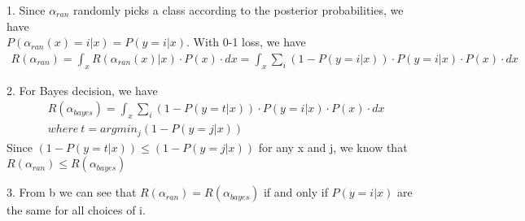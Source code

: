 \documentclass[12pt]{article}
\newenvironment{problem}[2][Problem]{\begin{trivlist}
\item[\hskip \labelsep {\bfseries #1}\hskip \labelsep {\bfseries #2}]}{\end{trivlist}}
\begin{document}
\begin{problem}{2. Bayesian vs randomized decision}
\item{1.} Since $\alpha_{ran}$ randomly picks a class according to the posterior probabilities, we have\\ 
  $P(\alpha_{ran}(x) = i|x) = P(y=i|x)$. With 0-1 loss, we have
  \begin{align*}
	R(\alpha_{ran}) = \int_xR(\alpha_{ran}(x)|x) \cdot P(x) \cdot dx = 
	\int_x \sum_i (1-P(y=i|x)) \cdot P(y=i|x) \cdot P(x) \cdot dx
  \end{align*}
\item{2.} For Bayes decision, we have
  \begin{align*}
	& R(\alpha_{bayes}) = \int_x \sum_i (1-P(y=t|x)) \cdot P(y=i|x) \cdot P(x) \cdot dx \\
	& where\ t = argmin_j(1-P(y=j|x))
  \end{align*}
  Since $ (1-P(y=t|x)) \leq (1-P(y=j|x))$ for any x and j, we know that $R(\alpha_{ran}) \leq R(\alpha_{bayes})$
\item{3.} From b we can see that $R(\alpha_{ran}) = R(\alpha_{bayes})$ if and only if $P(y=i|x)$ are the same for all choices of i.
\end{problem}
\end{document}
